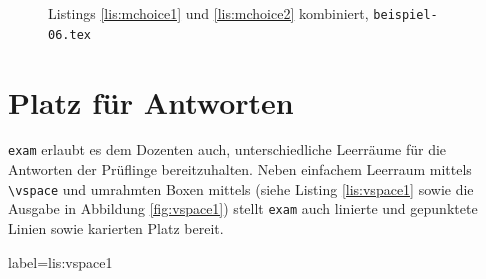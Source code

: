 \begin{figure}
\caption{Listings \ref{lis:mchoice1} und \ref{lis:mchoice2} kombiniert, \texttt{beispiel-06.tex}}\label{fig:mchoicea}
\end{figure}

\clearpage

\section{Platz für Antworten}

\texttt{exam} erlaubt es dem Dozenten auch, unterschiedliche Leerräume für die Antworten der Prüflinge bereitzuhalten. 
Neben einfachem Leerraum mittels \texttt{\textbackslash vspace} und umrahmten Boxen mittels (siehe Listing \ref{lis:vspace1} sowie die Ausgabe in Abbildung \ref{fig:vspace1}) stellt \texttt{exam} auch linierte und gepunktete Linien sowie karierten Platz bereit.

\begin{lfgwcode}{label={lis:vspace1}}
\vspace{<Länge>}

\newpage


\newpage
\end{lfgwcode}

